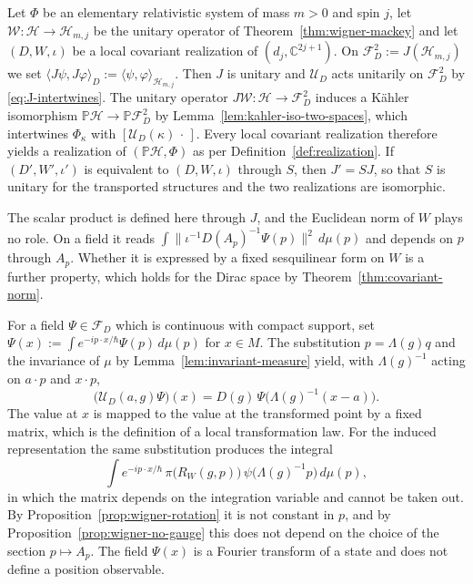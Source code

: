 \begin{remark}\label{rem:transported-norm}
	Let $\Phi$ be an elementary relativistic system of mass $m>0$ and spin $j$, let $\mathcal{W}:\mathcal{H}\to\mathcal{H}_{m,j}$ be the unitary operator of Theorem~\ref{thm:wigner-mackey} and let $(D,W,\iota)$ be a local covariant realization of $(d_j,\mathbb{C}^{2j+1})$. On $\mathcal{F}_D^2:=J(\mathcal{H}_{m,j})$ we set $\langle J\psi,J\varphi\rangle_D:=\langle\psi,\varphi\rangle_{\mathcal{H}_{m,j}}$. Then $J$ is unitary and $\mathcal{U}_D$ acts unitarily on $\mathcal{F}_D^2$ by \eqref{eq:J-intertwines}. The unitary operator $J\mathcal{W}:\mathcal{H}\to\mathcal{F}_D^2$ induces a Kähler isomorphism $\mathbb{P}\mathcal{H}\to\mathbb{P}\mathcal{F}_D^2$ by Lemma~\ref{lem:kahler-iso-two-spaces}, which intertwines $\Phi_\kappa$ with $[\mathcal{U}_D(\kappa)\,\cdot\,]$. Every local covariant realization therefore yields a realization of $(\mathbb{P}\mathcal{H},\Phi)$ as per Definition~\ref{def:realization}. If $(D',W',\iota')$ is equivalent to $(D,W,\iota)$ through $S$, then $J'=SJ$, so that $S$ is unitary for the transported structures and the two realizations are isomorphic.
	
	The scalar product is defined here through $J$, and the Euclidean norm of $W$ plays no role. On a field it reads $\int\|\iota^{-1}D(A_p)^{-1}\Psi(p)\|^2\,d\mu(p)$ and depends on $p$ through $A_p$. Whether it is expressed by a fixed sesquilinear form on $W$ is a further property, which holds for the Dirac space by Theorem~\ref{thm:covariant-norm}.
\end{remark}

\begin{remark}\label{rem:position-space}
	For a field $\Psi\in\mathcal{F}_D$ which is continuous with compact support, set $\Psi(x):=\int e^{-ip\cdot x/\hbar}\Psi(p)\,d\mu(p)$ for $x\in M$. The substitution $p=\Lambda(g)q$ and the invariance of $\mu$ by Lemma~\ref{lem:invariant-measure} yield, with $\Lambda(g)^{-1}$ acting on $a\cdot p$ and $x\cdot p$,
	\begin{equation*}
		\big(\mathcal{U}_D(a,g)\Psi\big)(x)=D(g)\,\Psi\big(\Lambda(g)^{-1}(x-a)\big).
	\end{equation*}
	The value at $x$ is mapped to the value at the transformed point by a fixed matrix, which is the definition of a local transformation law. For the induced representation the same substitution produces the integral
	\begin{equation*}
		\int e^{-ip\cdot x/\hbar}\,\pi\big(R_W(g,p)\big)\,\psi\big(\Lambda(g)^{-1}p\big)\,d\mu(p),
	\end{equation*}
	in which the matrix depends on the integration variable and cannot be taken out. By Proposition~\ref{prop:wigner-rotation} it is not constant in $p$, and by Proposition~\ref{prop:wigner-no-gauge} this does not depend on the choice of the section $p\mapsto A_p$. The field $\Psi(x)$ is a Fourier transform of a state and does not define a position observable.
\end{remark}

